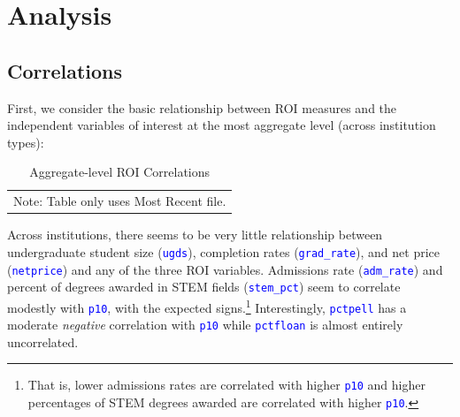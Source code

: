 \documentclass[12pt]{article}
\numberwithin{equation}{section}
\newcommand{\Varnm}[1]{\texttt{\textcolor{Blue}{#1}}}
\begin{document}
\newpage
\section{Analysis}
\subsection{Correlations}
First, we consider the basic relationship between ROI measures and the independent variables of interest at the most aggregate level (across institution types):

\begin{table}[ht]
\caption{Aggregate-level ROI Correlations}
\label{tab:agg_correls_mr}
\begin{adjustbox}{center}
\begin{tabular}{@{}lcccccccccc@{}}
\hline\hline
\\[-9pt] \hline\hline
\multicolumn{11}{l}{\footnotesize Note: Table only uses Most Recent file.}\\
\end{tabular}
\end{adjustbox}
\end{table}
Across institutions, there seems to be very little relationship between undergraduate student size (\Varnm{ugds}), completion rates (\Varnm{grad\_rate}), and net price (\Varnm{netprice}) and any of the three ROI variables. Admissions rate (\Varnm{adm\_rate}) and percent of degrees awarded in STEM fields (\Varnm{stem\_pct}) seem to correlate modestly with \Varnm{p10}, with the expected signs.\footnote{That is, lower admissions rates are correlated with higher \Varnm{p10} and higher percentages of STEM degrees awarded are correlated with higher \Varnm{p10}.} Interestingly, \Varnm{pctpell} has a moderate \textit{negative} correlation with \Varnm{p10} while \Varnm{pctfloan} is almost entirely uncorrelated. 
\end{document}
